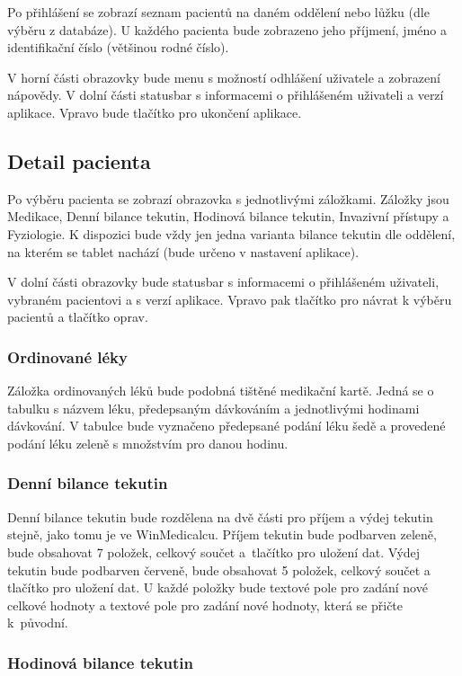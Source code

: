 Po přihlášení se zobrazí seznam pacientů na daném oddělení nebo lůžku (dle výběru z databáze). U každého pacienta bude zobrazeno jeho příjmení, jméno a identifikační číslo (většinou rodné číslo).

V horní části obrazovky bude menu s možností odhlášení uživatele a zobrazení nápovědy. V dolní části statusbar s informacemi o přihlášeném uživateli a verzí aplikace. Vpravo bude tlačítko pro ukončení aplikace.

\subsection{Detail pacienta}

Po výběru pacienta se zobrazí obrazovka s jednotlivými záložkami. Záložky jsou Medikace, Denní bilance tekutin, Hodinová bilance tekutin, Invazivní přístupy a Fyziologie. K dispozici bude vždy jen jedna varianta bilance tekutin dle oddělení, na kterém se tablet nachází (bude určeno v nastavení aplikace).

V dolní části obrazovky bude statusbar s informacemi o přihlášeném uživateli, vybraném pacientovi a s verzí aplikace. Vpravo pak tlačítko pro návrat k výběru pacientů a tlačítko oprav.

\subsubsection{Ordinované léky}

Záložka ordinovaných léků bude podobná tištěné medikační kartě. Jedná se o tabulku s názvem léku, předepsaným dávkováním a jednotlivými hodinami dávkování. V tabulce bude vyznačeno předepsané podání léku šedě a provedené podání léku zeleně s množstvím pro danou hodinu.

\subsubsection{Denní bilance tekutin}

Denní bilance tekutin bude rozdělena na dvě části pro příjem a výdej tekutin stejně, jako tomu je ve WinMedicalcu. Příjem tekutin bude podbarven zeleně, bude obsahovat 7 položek, celkový součet a~tlačítko pro uložení dat. Výdej tekutin bude podbarven červeně, bude obsahovat 5 položek, celkový součet a tlačítko pro uložení dat. U každé položky bude textové pole pro zadání nové celkové hodnoty a textové pole pro zadání nové hodnoty, která se přičte k~původní.

\subsubsection{Hodinová bilance tekutin}


